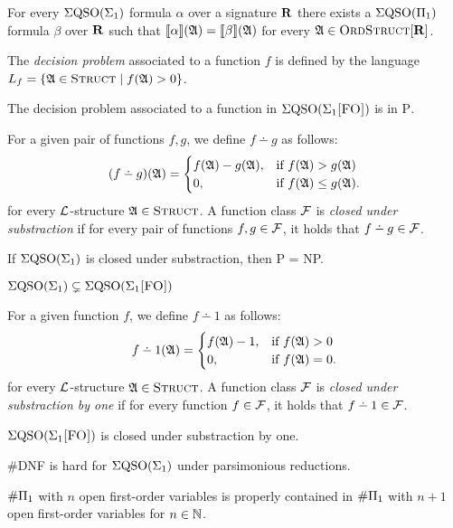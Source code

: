 \begin{theorem} \label{eqso-sigma-one-in-eqso-pi-one}
	For every $\Sigma{\rm QSO}(\Sigma_{1})$ formula $\alpha$ over a signature $\mathbf{R}$ there exists a $\Sigma{\rm QSO}(\Pi_{1})$ formula $\beta$ over $\mathbf{R}$ such that ${\llbracket{}{\alpha}\rrbracket}(\mathfrak{A}) = {\llbracket{}{\beta}\rrbracket}(\mathfrak{A})$ for every $\mathfrak{A}\in\text{\sc OrdStruct}[\mathbf{R}]$.
\end{theorem}


The {\em decision problem} associated to a function $f$ is defined by the language $L_f = \{\mathfrak{A} \in \text{\sc Struct} \mid f(\mathfrak{A}) > 0\}$.

\begin{theorem} \label{decisionptime}
	The decision problem associated to a function in $\Sigma{\rm QSO}(\Sigma_{1}\textsc{[FO]})$ is in \textsc{P}.
\end{theorem}

For a given pair of functions $f,g$, we define $f \dotminus g$ as follows:
\begin{eqnarray*}
	(f \dotminus g)(\A) =
	\begin{cases}
		f(\A)-g(\A), & \text{if }f(\A)>g(\A) \\
		0, & \text{if }f(\A) \leq g(\A).
	\end{cases}
\end{eqnarray*}
for every $\L$-structure $\mathfrak{A} \in \text{\sc Struct}$. A function class $\F$ is {\em closed under substraction} if for every pair of functions $f,g \in \F$, it holds that $f \dotminus g \in \F$.

\begin{theorem} \label{sub-pnp}
	If $\Sigma{\rm QSO}(\Sigma_{1})$ is closed under substraction, then {\sc P} = {\sc NP}.
\end{theorem}

\begin{theorem} \label{sigma1strict}
	$\Sigma{\rm QSO}(\Sigma_{1}) \subsetneq \Sigma{\rm QSO}(\Sigma_{1}\textsc{[FO]})$
\end{theorem}

For a given function $f$, we define $f \dotminus 1$ as follows:
\begin{eqnarray*}
	f \dotminus 1(\A) =
	\begin{cases}
		f(\A)-1, & \text{if }f(\A) > 0 \\
		0, & \text{if }f(\A) = 0.
	\end{cases}
\end{eqnarray*}
for every $\L$-structure $\mathfrak{A} \in \text{\sc Struct}$. A function class $\F$ is {\em closed under substraction by one} if for every function $f \in \F$, it holds that $f \dotminus 1 \in \F$.

\begin{theorem} \label{sigmafo-minusone}
	$\Sigma{\rm QSO}(\Sigma_{1}\textsc{[FO]})$ is closed under substraction by one.
\end{theorem}

\begin{theorem} \label{dnf-pars}
	{\sc \#DNF} is hard for $\Sigma{\rm QSO}(\Sigma_{1})$ under parsimonious reductions. 
\end{theorem}

\begin{theorem} \label{nplusone-strict}
	$\#\Pi_{1}$ with $n$ open first-order variables is properly contained in $\#\Pi_{1}$ with $n+1$ open first-order variables for $n\in\mathbb{N}$.  
\end{theorem}